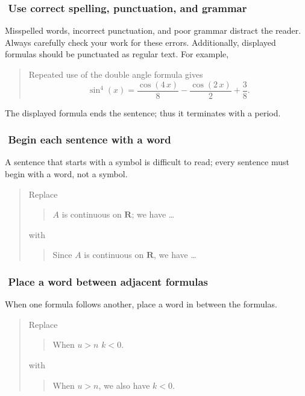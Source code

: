\documentclass[12pt,fleqn]{article}
\newcounter{ex}\setcounter{ex}{0}
\newcommand{\ex}{%
\hspace{-0.2in} \setcounter{ex}{\value{ex}+1}
\theex \,\,}
\newcounter{se}\setcounter{se}{0}
\begin{document}

\subsubsection*{\ex  Use correct spelling, punctuation, and grammar}

Misspelled words, incorrect punctuation, and poor grammar distract the reader.  
Always carefully check your work for these errors. Additionally, 
displayed formulas should be punctuated as regular text.  For example,
\begin{quote}
Repeated use of the  double angle formula gives
\[
   \sin^4(x) = \frac {\cos \left(4\,x\right)}{8}-\frac {\cos \left(2\,x\right)}{2%
 }+\frac {3}{8}. 
\]
\end{quote}
The displayed formula ends the sentence; thus it terminates with a period.

\subsubsection*{\ex  Begin each sentence with a word}  


A sentence that starts with a symbol is difficult to 
read; every sentence must begin with a word, not a symbol.

\begin{quote}
Replace
\begin{quote}
$A$ is continuous on $\mathbf{R}$; we have \dots
\end{quote}
with
\begin{quote}
Since $A$ is continuous on $\mathbf{R}$, we have \dots
\end{quote}
\end{quote}

\subsubsection*{\ex Place a word between adjacent formulas}

When one formula follows another, place a word in between the formulas.

\begin{quote}
Replace
\begin{quote}
   When \(u > n\)  \(k < 0\).
\end{quote}
with
\begin{quote}
  When \(u > n\), we also have \(k < 0\).
\end{quote}
\end{quote}
\end{document}
